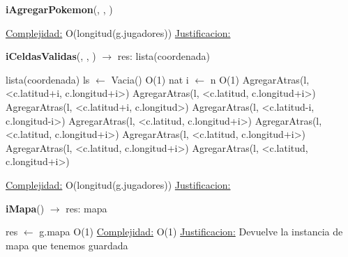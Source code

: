 \begin{Algoritmos}
\begin{algorithm}[H]{\textbf{iAgregarPokemon}(, , )}
\begin{algorithmic}[1]
		\medskip
		\Statex \underline{Complejidad:} O(longitud(g.jugadores))
		\Statex \underline{Justificacion:}  
	\end{algorithmic}
\end{algorithm}

\begin{algorithm}[H]{\textbf{iCeldasValidas}(, , ) $\to$ res: lista(coordenada)}
	\begin{algorithmic}[1]
		\State lista(coordenada) ls $\gets$ Vacia() \Comment O(1)
		\State nat i $\gets$ n \Comment O(1)
				\State AgregarAtras(l, <c.latitud+i, c.longitud+i>)
			\EndIf
				\State AgregarAtras(l, <c.latitud, c.longitud+i>)			
			\EndIf
				\State AgregarAtras(l, <c.latitud+i, c.longitud>)			
			\EndIf
				\State AgregarAtras(l, <c.latitud-i, c.longitud-i>)			
			\EndIf
				\State AgregarAtras(l, <c.latitud, c.longitud+i>)			
			\EndIf
				\State AgregarAtras(l, <c.latitud, c.longitud+i>)			
			\EndIf
				\State AgregarAtras(l, <c.latitud, c.longitud+i>)			
			\EndIf
				\State AgregarAtras(l, <c.latitud, c.longitud+i>)			
			\EndIf
				\State AgregarAtras(l, <c.latitud, c.longitud+i>)			
			\EndIf
			
		\EndWhile
		\medskip
		\Statex \underline{Complejidad:} O(longitud(g.jugadores))
		\Statex \underline{Justificacion:}
	\end{algorithmic}
\end{algorithm}



\begin{algorithm}[H]{\textbf{iMapa}() $\to$ res: mapa}
	\begin{algorithmic}[1]
		\State res $\gets$ g.mapa \Comment O(1)
		\medskip
		\Statex \underline{Complejidad:} O(1)
		\Statex \underline{Justificacion:} Devuelve la instancia de mapa que tenemos guardada
	\end{algorithmic}
\end{algorithm}



\end{Algoritmos}
